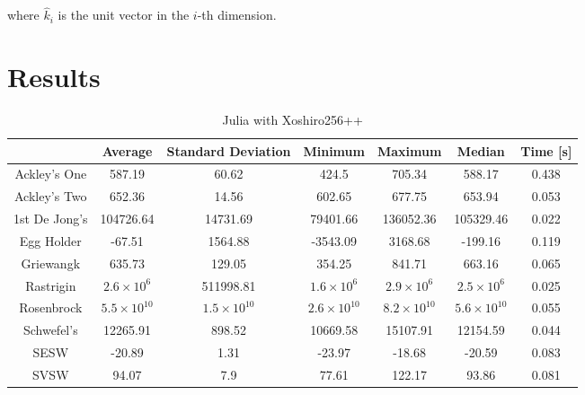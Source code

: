 \documentclass{article}
\begin{document}
            where $\hat{k}_i$ is the unit vector in the $i$-th dimension.

    \section{Results}

        \begin{table}[h]
        \begin{centering}
            \begin{tabular}{|c||c|c|c|c|c|c|}
                \hline
                            & Average & Standard Deviation & Minimum & Maximum & Median & Time [s] \\
                \hline
                \hline
                Ackley's One & 587.19 & 60.62 & 424.5 & 705.34 & 588.17 & 0.438 \\
                \hline
                Ackley's Two & 652.36 & 14.56 & 602.65 & 677.75 & 653.94 & 0.053 \\
                \hline
                1st De Jong's & 104726.64 & 14731.69 & 79401.66 & 136052.36 & 105329.46 & 0.022 \\
                \hline
                Egg Holder & -67.51 & 1564.88 & -3543.09 & 3168.68 & -199.16 & 0.119 \\
                \hline
                Griewangk & 635.73 & 129.05 & 354.25 & 841.71 & 663.16 & 0.065 \\
                \hline
                Rastrigin & $2.6 \times 10^{6}$ & 511998.81 & $1.6 \times 10^6$ & $2.9 \times 10^6$ & $2.5 \times 10^6$ & 0.025 \\
                \hline
                Rosenbrock & $5.5 \times 10^{10}$ & $1.5 \times 10^{10}$ & $2.6 \times 10^{10}$ & $8.2 \times 10^{10}$ & $5.6 \times 10^{10}$ & 0.055 \\
                \hline
                Schwefel's & 12265.91 & 898.52 & 10669.58 & 15107.91 & 12154.59 & 0.044 \\
                \hline
                SESW & -20.89 & 1.31 & -23.97 & -18.68 & -20.59 & 0.083 \\
                \hline
                SVSW & 94.07 & 7.9 & 77.61 & 122.17 & 93.86 & 0.081 \\
                \hline
            \end{tabular}
            \caption{Julia with Xoshiro256++}
        \end{centering}
        \end{table}
\end{document}
